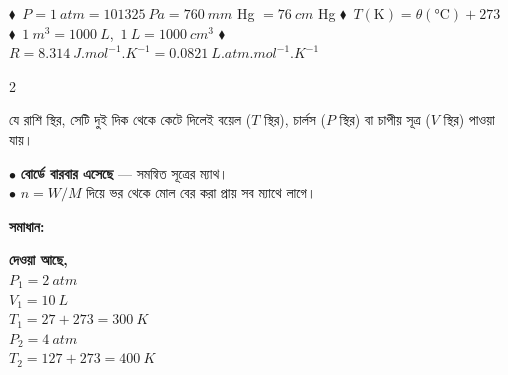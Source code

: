 \documentclass[10.5pt,twoside]{article}
\begin{document}
\begin{remember}
\noindent$\blacklozenge$\ $P=\SI{1}{atm}=\SI{101325}{Pa}=\SI{760}{mm}$ Hg $=\SI{76}{cm}$ Hg\qquad
$\blacklozenge$\ $T(\mathrm{K})=\theta(\si{\degreeCelsius})+273$\\
$\blacklozenge$\ $\SI{1}{m^3}=\SI{1000}{L}$,\ $\SI{1}{L}=\SI{1000}{cm^3}$\qquad
$\blacklozenge$\ $R=\SI{8.314}{J.mol^{-1}.K^{-1}}=\SI{0.0821}{L.atm.mol^{-1}.K^{-1}}$
\end{remember}
\newpage
\begin{multicols}{2}
\begin{conceptbox}
যে রাশি স্থির, সেটি দুই দিক থেকে কেটে দিলেই বয়েল ($T$ স্থির), চার্লস ($P$ স্থির) বা চাপীয় সূত্র ($V$ স্থির) পাওয়া যায়।
\begin{roundbox}[left=3pt,top=2pt,bottom=2pt]
$\bullet$ \textbf{বোর্ডে বারবার এসেছে} — সমন্বিত সূত্রের ম্যাথ।\\
$\bullet$ $n=W/M$ দিয়ে ভর থেকে মোল বের করা প্রায় সব ম্যাথে লাগে।
\end{roundbox}
\end{conceptbox}

\begin{tipbox}
\end{tipbox}

\medskip\textbf{সমাধান:}\par
{}
{\textbf{দেওয়া আছে,}\\ $P_1=\SI{2}{atm}$\\ $V_1=\SI{10}{L}$\\ $T_1=27+273=\SI{300}{K}$\\ $P_2=\SI{4}{atm}$\\ $T_2=127+273=\SI{400}{K}$}


\end{multicols}
\end{document}
